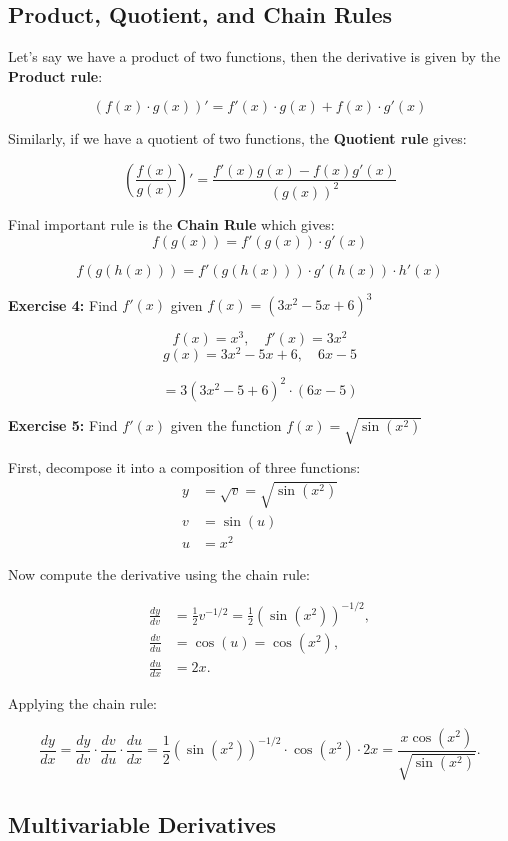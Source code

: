 \subsection{Product, Quotient, and Chain Rules}

Let's say we have a product of two functions, then the derivative is given by the \textbf{Product rule}:

\[
(f(x) \cdot g(x))' = f'(x) \cdot g(x) + f(x) \cdot g'(x)
\]

Similarly, if we have a quotient of two functions, the \textbf{Quotient rule} gives:

\[
\left( \frac{f(x)}{g(x)} \right)' = \frac{f'(x)g(x) - f(x)g'(x)}{(g(x))^2}
\]

Final important rule is the \textbf{Chain Rule} which gives:
\[
f(g(x)) = f'(g(x)) \cdot g'(x)
\]

\[f(g(h(x)))=f'(g(h(x))) \cdot g'(h(x)) \cdot h'(x)\]

\textbf{Exercise 4:} Find \( f'(x) \) given \(f(x) = (3x^2 - 5x + 6)^3\)

\[ f(x) = x^3, \quad f'(x) = 3x^2\]
\[ g(x) = 3x^2 -5x +6, \quad 6x - 5\]

\[= 3(3x^2 -5 + 6)^2 \cdot (6x - 5)\]

\textbf{Exercise 5:} Find \( f'(x) \) given the function \( f(x) = \sqrt{\sin(x^2)} \)

\bigskip

First, decompose it into a composition of three functions:
\begin{align*}
y &= \sqrt{v} = \sqrt{\sin(x^2)} \\
v &= \sin(u) \\
u &= x^2
\end{align*}

Now compute the derivative using the chain rule:

\begin{align*}
\frac{dy}{dv} &= \frac{1}{2} v^{-1/2} = \frac{1}{2} \left( \sin(x^2) \right)^{-1/2}, \\
\frac{dv}{du} &= \cos(u) = \cos(x^2), \\
\frac{du}{dx} &= 2x.
\end{align*}

Applying the chain rule:

\[
\frac{dy}{dx} = \frac{dy}{dv} \cdot \frac{dv}{du} \cdot \frac{du}{dx}
= \frac{1}{2} \left( \sin(x^2) \right)^{-1/2} \cdot \cos(x^2) \cdot 2x
= \frac{x \cos(x^2)}{\sqrt{\sin(x^2)}}.
\]

\subsection{Multivariable Derivatives}

